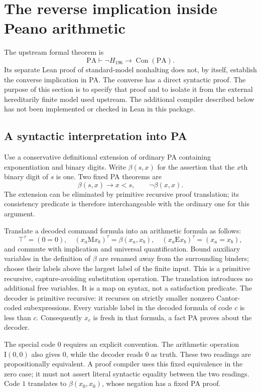 \section{The reverse implication inside Peano arithmetic}
\label{sec:reverse-pa}

The upstream formal theorem is
\[
 \mathrm{PA}\vdash \neg H_{196}\longrightarrow\operatorname{Con}(\mathrm{PA}).
\]
Its separate Lean proof of standard-model nonhalting does not, by itself,
establish the converse implication in PA. The converse has a direct
syntactic proof. The purpose of this section is to specify that proof and
to isolate it from the external hereditarily finite model used upstream.
The additional compiler described below has not been implemented or checked
in Lean in this package.

\subsection{A syntactic interpretation into PA}

Use a conservative definitional extension of ordinary PA containing
exponentiation and binary digits. Write $\beta(s,x)$ for the assertion that
the $x$th binary digit of $s$ is one. Two fixed PA theorems are
\[
 \beta(s,x)\longrightarrow x<s,
 \qquad \neg\beta(x,x).
\]
The extension can be eliminated by primitive recursive proof translation;
its consistency predicate is therefore interchangeable with the ordinary
one for this argument.

Translate a decoded command formula into an arithmetic formula as follows:
\[
 \top^\tau=(0=0),\quad
 (x_a\mathrel{\mathrm M}x_b)^\tau=\beta(x_a,x_b),\quad
 (x_a\mathrel{\mathrm E}x_b)^\tau=(x_a=x_b),
\]
and commute with implication and universal quantification. Bound auxiliary
variables in the definition of $\beta$ are renamed away from the surrounding
binders; choose their labels above the largest label of the finite input.
This is a primitive recursive, capture-avoiding substitution operation.
The translation introduces no additional free variables. It is a map on
syntax, not a satisfaction predicate. The decoder is primitive
recursive: it recurses on strictly smaller nonzero Cantor-coded
subexpressions. Every variable label in the decoded formula of code $c$ is
less than $c$. Consequently $x_c$ is fresh in that formula, a fact PA proves
about the decoder.

The special code $0$ requires an explicit convention. The arithmetic
operation $\mathrm I(0,0)$ also gives $0$, while the decoder reads $0$ as
truth. These two readings are propositionally equivalent. A proof compiler
uses this fixed equivalence in the zero case; it must not assert literal
syntactic equality between the two readings. Code $1$ translates to
$\beta(x_0,x_0)$, whose negation has a fixed PA proof.

